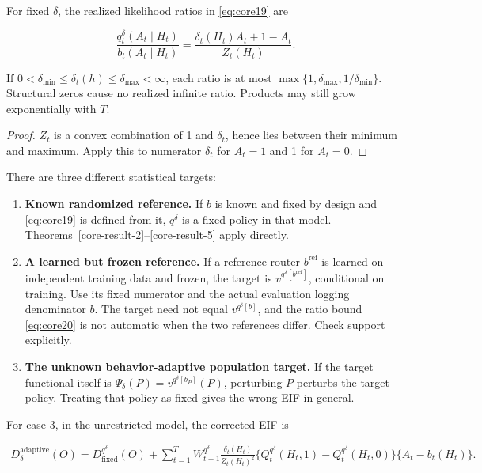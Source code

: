 \begin{proposition}\label{core-result-6}
For fixed \(\delta\), the realized likelihood ratios in \eqref{eq:core19} are

\begin{equation}\label{eq:core20}
\frac{q_t^{\delta}(A_t\mid H_t)}{b_t(A_t\mid H_t)}
=\frac{\delta_t(H_t)A_t+1-A_t}{Z_t(H_t)}.
\end{equation}

If \(0<\delta_{\min}\le\delta_t(h)\le\delta_{\max}<\infty\), each ratio is at most \(\max\{1,\delta_{\max},1/\delta_{\min}\}\). Structural zeros cause no realized infinite ratio. Products may still grow exponentially with \(T\).
\end{proposition}
\begin{proof}
\(Z_t\) is a convex combination of 1 and \(\delta_t\), hence lies between their minimum and maximum. Apply this to numerator \(\delta_t\) for \(A_t=1\) and 1 for \(A_t=0\).
\end{proof}

There are three different statistical targets:

\begin{enumerate}
\def\labelenumi{\arabic{enumi}.}
\tightlist
\item
  \textbf{Known randomized reference.} If \(b\) is known and fixed by design and \eqref{eq:core19} is defined from it, \(q^{\delta}\) is a fixed policy in that model. Theorems~\ref{core-result-2}--\ref{core-result-5} apply directly.
\item
  \textbf{A learned but frozen reference.} If a reference router \(b^{\mathrm{ref}}\) is learned on independent training data and frozen, the target is \(v^{q^{\delta}[b^{\mathrm{ref}}]}\), conditional on training. Use its fixed numerator and the actual evaluation logging denominator \(b\). The target need not equal \(v^{q^{\delta}[b]}\), and the ratio bound \eqref{eq:core20} is not automatic when the two references differ. Check support explicitly.
\item
  \textbf{The unknown behavior-adaptive population target.} If the target functional itself is \(\Psi_{\delta}(P)=v^{q^{\delta}[b_P]}(P)\), perturbing \(P\) perturbs the target policy. Treating that policy as fixed gives the wrong EIF in general.
\end{enumerate}

For case 3, in the unrestricted model, the corrected EIF is

\begin{equation}\label{eq:core21}
\begin{split}
D_{\delta}^{\mathrm{adaptive}}(O)
=D^{q^{\delta}}_{\mathrm{fixed}}(O)
+\sum_{t=1}^{T}W_{t-1}^{q^{\delta}}
\frac{\delta_t(H_t)}{Z_t(H_t)^2}
\{Q_t^{q^{\delta}}(H_t,1)-Q_t^{q^{\delta}}(H_t,0)\}
\{A_t-b_t(H_t)\}.
\end{split}
\end{equation}

